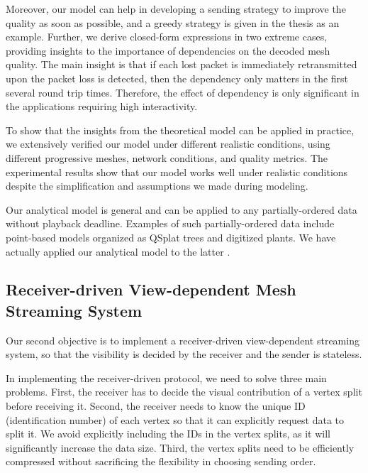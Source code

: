     Moreover, our model can help in developing a sending
    strategy to improve the quality as soon as possible,
    and a greedy strategy is given in the thesis as an example. 
    Further, we derive closed-form expressions in two extreme cases,
    providing insights to the importance of dependencies on the
    decoded mesh quality. The main insight is that if each lost packet
    is immediately retransmitted upon the packet loss is detected, 
    then the dependency only matters in the first several round trip times. 
    Therefore, the effect of dependency is only significant in the applications
    requiring high interactivity. 

    To show that the insights from the theoretical model can be applied
    in practice, we extensively verified our model under different realistic conditions,
    using different progressive meshes, network conditions, and quality metrics. 
    The experimental results show that our model works well under realistic 
    conditions despite the simplification and assumptions we made during
    modeling.

    Our analytical model is general and can be applied to any 
    partially-ordered data without playback deadline.
    Examples of such partially-ordered data include point-based models 
    organized as QSplat trees \cite{rusinkiewicz:qsplat} and digitized plants.  
    We have actually applied our analytical model to the latter \cite{plant:seb}.
    
    \subsection{Receiver-driven View-dependent Mesh Streaming System}
    Our second objective is to implement a receiver-driven view-dependent streaming system,
    so that the visibility is decided by the receiver and the sender is stateless.
    
    In implementing the receiver-driven protocol, we need to solve three main problems.
    First, the receiver has to decide the visual contribution 
    of a vertex split before receiving it.
    Second, the receiver needs to know the unique ID
    (identification number) of each vertex so that it
    can explicitly request data to split it. 
    We avoid explicitly including the IDs in the vertex splits,
    as it will significantly increase the data size.
    Third, the vertex splits need to be efficiently compressed without
    sacrificing the flexibility in choosing sending order.
    
